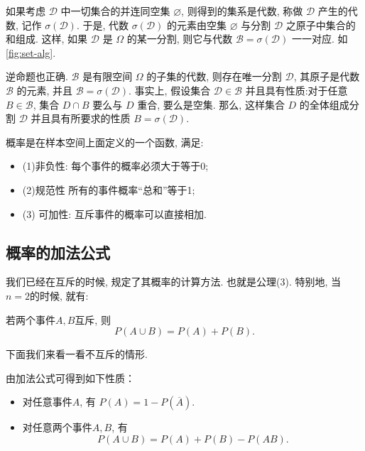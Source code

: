 如果考虑 $\mathscr{D}$ 中一切集合的并连同空集 $\varnothing$, 则得到的集系是代数, 称做 $\mathscr{D}$ 产生的代数, 记作 $\sigma(\mathscr{D})$. 于是, 代数 $\sigma(\mathscr{D})$ 的元素由空集 $\varnothing$ 与分割 $\mathscr{D}$ 之原子中集合的和组成.
这样, 如果 $\mathscr{D}$ 是 $\Omega$ 的某一分割, 则它与代数 $\mathscr{B}=\sigma(\mathscr{D})$ 一一对应. 如\cref{fig:set-alg}.



逆命题也正确. $\mathscr{B}$ 是有限空间 $\Omega$ 的子集的代数, 则存在唯一分割 $\mathscr{D}$, 其原子是代数 $\mathscr{B}$ 的元素, 并且 $\mathscr{B}=\sigma(\mathscr{D})$. 事实上, 假设集合 $\mathscr{D} \in \mathscr{B}$ 并且具有性质:对于任意 $B \in \mathscr{B}$, 集合 $D \cap B$ 要么与 $D$ 重合, 要么是空集. 那么, 这样集合 $D$ 的全体组成分割 $\mathscr{D}$ 并且具有所要求的性质 $B=\sigma(\mathscr{D})$. 



\begin{takeaway}
    概率是在样本空间上面定义的一个函数, 满足: 
    \begin{itemize}
        \item (1)非负性: 每个事件的概率必须大于等于0; 
        \item (2)规范性
        所有的事件概率``总和''等于1; 
        \item (3) 可加性: 互斥事件的概率可以直接相加.
    \end{itemize}
\end{takeaway}
    


\subsection{概率的加法公式}
我们已经在互斥的时候, 规定了其概率的计算方法. 也就是公理(3). 特别地, 当$n=2$的时候, 就有: 
\begin{proposition}[加法公式]
    若两个事件$A,B$互斥, 则
    $$P(A\cup B)=P(A)+P(B).$$
\end{proposition}

下面我们来看一看不互斥的情形.
\begin{remark}
    由加法公式可得到如下性质：
    \begin{itemize}
        \item 对任意事件$A$, 有
              $P(A)=1-P\left(\overline{A}\right).$
        \item 对任意两个事件$A,B$, 有
              $$P(A\cup B)=P(A)+P(B)-P(AB).$$
    \end{itemize}
\end{remark}


